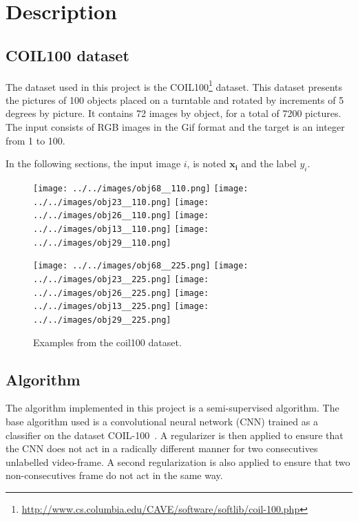 \documentclass{article} %
\begin{document}
\section{Description}
\subsection{COIL100 dataset}

The dataset used in this project is the COIL100\footnote{\url{http://www.cs.columbia.edu/CAVE/software/softlib/coil-100.php}} dataset\cite{nayar1996real}. This dataset presents the pictures of 100 objects placed on a turntable and rotated by increments of 5 degrees by picture. It contains 72 images by object, for a total of 7200 pictures. The input consists of RGB images in the Gif format and the target is an integer from 1 to 100.

In the following sections, the input image $i$, is noted $\mathbf{x_i}$ and the label $y_i$.

\begin{figure}[htbp]%

\parbox{\textwidth}{
\centering
\texttt{[image: ../../images/obj68\_\_110.png]}
\texttt{[image: ../../images/obj23\_\_110.png]}
\texttt{[image: ../../images/obj26\_\_110.png]}
\texttt{[image: ../../images/obj13\_\_110.png]}
\texttt{[image: ../../images/obj29\_\_110.png]}
}
\qquad
\begin{minipage}{\textwidth}%
\centering
\texttt{[image: ../../images/obj68\_\_225.png]}
\texttt{[image: ../../images/obj23\_\_225.png]}
\texttt{[image: ../../images/obj26\_\_225.png]}
\texttt{[image: ../../images/obj13\_\_225.png]}
\texttt{[image: ../../images/obj29\_\_225.png]}
\end{minipage}%
\caption{Examples from the coil100 dataset.}
\label{fig:coil100}
\end{figure}


\subsection{Algorithm}
The algorithm implemented in this project is a semi-supervised algorithm. The base algorithm used is a convolutional neural network (CNN) trained as a classifier on the dataset COIL-100~\cite{lecun1998gradient}. A regularizer is then applied to ensure that the CNN does not act in a radically different manner for two consecutives unlabelled video-frame. A second regularization is also applied to ensure that two non-consecutives frame do not act in the same way.
\end{document}
